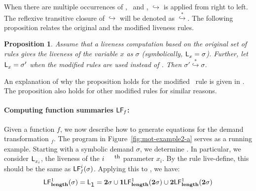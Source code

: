 \documentclass[9pt,preprint,letter,nonatbib]{sigplanconf}
\newtheorem{proposition}[theorem]{Proposition}
\begin{document}
When   there  are   multiple   occurrences  of   \bcar,
\bcdr\  and \clazy,  $\hookrightarrow$ is  applied from
right  to left.   The reflexive  transitive closure  of
$\hookrightarrow$      will      be     denoted      as
$\stackrel{*}{\hookrightarrow}$.      The     following
proposition  relates  the  original  and  the  modified
liveness rules. 
\begin{proposition}
Assume  that  a  liveness   computation  based  on  the
original  set  of  rules  gives  the  liveness  of  the
variable  $x$   as $\sigma$
(symbolically,  $\mathsf{L}_{{x}}^{}=  \sigma$).  Further,  let
$\mathsf{L}_{{x}}^{}= \sigma'$ when the modified rules are used
instead      of      \Lfunonly.      Then      $\sigma'
\stackrel{*}{\hookrightarrow} \sigma$.
\end{proposition}

An  explanation of  why the  proposition holds  for the
modified  \CONS\ rule  is  given in  \cite{asati14lgc}.
The proposition also holds for other modified rules for
similar reasons.


\paragraph{Computing function summaries $\mathsf{LF}_{\mathit f}$:}
Given a  function $\mathit{f}$, we now  describe how to
generate  equations   for  the   demand  transformation
\Lfonly$_\mathit{f}$.        The       program       in
Figure~\ref{fig:mot-example2-a}   serves  as   a  running
example.  Starting with a  symbolic demand $\sigma$, we
determine  .   In
particular, we  consider $\mathsf{L}_{{x_i}}^{}$,  the liveness
of the $i^{\mbox{\footnotesize th}}$ parameter $x_i$.   By   the   rule   {\sc
  live-define},   this   should    be   the   same   as
$\mathsf{LF}_{\mathit f}^{i}( {\mathit \sigma})$. Applying this to \length, we have:
$$
 \mathsf{LF}_{\mathit {\mathbf{length}}}^{1}( {\mathit \sigma}) = \mathsf{L}_{{\mbox{\tt l}}}^{} = {\mathbf{2}}\sigma \cup \mathbf{1}\mathsf{LF}_{\mathit {\mathbf{length}}}^{1}( {\mathit {{\mathbf{2}}}\sigma})
  \cup {\mathbf{2}}\mathsf{LF}_{\mathit {\mathbf{length}}}^{1}( {\mathit {{\mathbf{2}}}\sigma})
$$
\end{document}
